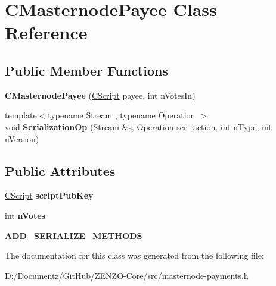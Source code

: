 \hypertarget{class_c_masternode_payee}{}\section{C\+Masternode\+Payee Class Reference}
\label{class_c_masternode_payee}
\subsection*{Public Member Functions}
\begin{DoxyCompactItemize}
\item 
\mbox{\label{class_c_masternode_payee_a39fb9426ef5a30145589094998efe7e9}} 
{\bfseries C\+Masternode\+Payee} (\mbox{\hyperlink{class_c_script}{C\+Script}} payee, int n\+Votes\+In)
\item 
\mbox{\label{class_c_masternode_payee_a43f62a2409a02ccb16b4b43b00442888}} 
{\footnotesize template$<$typename Stream , typename Operation $>$ }\\void {\bfseries Serialization\+Op} (Stream \&s, Operation ser\+\_\+action, int n\+Type, int n\+Version)
\end{DoxyCompactItemize}
\subsection*{Public Attributes}
\begin{DoxyCompactItemize}
\item 
\mbox{\label{class_c_masternode_payee_ab7f8d7f7108b556c92edd00ddd190e63}} 
\mbox{\hyperlink{class_c_script}{C\+Script}} {\bfseries script\+Pub\+Key}
\item 
\mbox{\label{class_c_masternode_payee_a85f2282517fea195b3c8e7a65f816d92}} 
int {\bfseries n\+Votes}
\item 
\mbox{\label{class_c_masternode_payee_a601ce07af776d21f02a76878c6de16e8}} 
{\bfseries A\+D\+D\+\_\+\+S\+E\+R\+I\+A\+L\+I\+Z\+E\+\_\+\+M\+E\+T\+H\+O\+DS}
\end{DoxyCompactItemize}


The documentation for this class was generated from the following file\+:\begin{DoxyCompactItemize}
\item 
D\+:/\+Documentz/\+Git\+Hub/\+Z\+E\+N\+Z\+O-\/\+Core/src/masternode-\/payments.\+h\end{DoxyCompactItemize}
